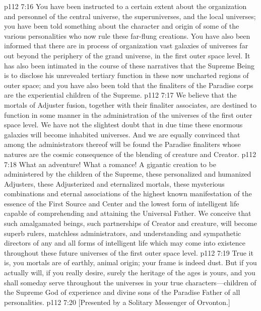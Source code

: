 \vs p112 7:16 You have been instructed to a certain extent about the organization and personnel of the central universe, the superuniverses, and the local universes; you have been told something about the character and origin of some of the various personalities who now rule these far\hyp{}flung creations. You have also been informed that there are in process of organization vast galaxies of universes far out beyond the periphery of the grand universe, in the first outer space level. It has also been intimated in the course of these narratives that the Supreme Being is to disclose his unrevealed tertiary function in these now uncharted regions of outer space; and you have also been told that the finaliters of the Paradise corps are the experiential children of the Supreme.
\vs p112 7:17 We believe that the mortals of Adjuster fusion, together with their finaliter associates, are destined to function in some manner in the administration of the universes of the first outer space level. We have not the slightest doubt that in due time these enormous galaxies will become inhabited universes. And we are equally convinced that among the administrators thereof will be found the Paradise finaliters whose natures are the cosmic consequence of the blending of creature and Creator.
\vs p112 7:18 What an adventure! What a romance! A gigantic creation to be administered by the children of the Supreme, these personalized and humanized Adjusters, these Adjusterized and eternalized mortals, these mysterious combinations and eternal associations of the highest known manifestation of the essence of the First Source and Center and the lowest form of intelligent life capable of comprehending and attaining the Universal Father. We conceive that such amalgamated beings, such partnerships of Creator and creature, will become superb rulers, matchless administrators, and understanding and sympathetic directors of any and all forms of intelligent life which may come into existence throughout these future universes of the first outer space level.\plusone
\pc \vs p112 7:19 True it is, you mortals are of earthly, animal origin; your frame is indeed dust. But if you actually will, if you really desire, surely the heritage of the ages is yours, and you shall someday serve throughout the universes in your true characters---children of the Supreme God of experience and divine sons of the Paradise Father of all personalities.
\vsetoff
\vs p112 7:20 [Presented by a Solitary Messenger of Orvonton.]
